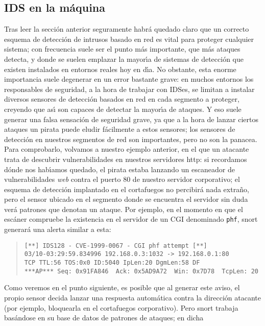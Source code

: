 \subsection{IDS en la m\'aquina}
Tras leer la secci\'on anterior seguramente habr\'a quedado claro que un 
correcto esquema de detecci\'on de intrusos basado en red es vital para 
proteger cualquier sistema; con frecuencia suele ser el punto m\'as importante,
que m\'as ataques detecta, y donde se suelen emplazar la mayor\'{\i}a de 
sistemas de detecci\'on que existen instalados en entornos reales hoy en 
d\'{\i}a. No obstante, esta enorme importancia suele degenerar en un error
bastante grave: en muchos entornos los responsables de seguridad, a la hora de
trabajar con IDSes, se limitan a instalar diversos sensores de detecci\'on 
basados en red en cada segmento a proteger, creyendo que as\'{\i} son capaces 
de detectar la mayor\'{\i}a de ataques. Y eso suele generar una falsa 
sensaci\'on de seguridad grave, ya que a la hora de lanzar ciertos ataques un
pirata puede eludir f\'acilmente a estos sensores; los sensores de detecci\'on 
en nuestros segmentos de red son importantes, pero no son la panacea. Para 
comprobarlo, volvamos a nuestro ejemplo anterior, en el que un atacante trata 
de descubrir vulnerabilidades en nuestros servidores {\sc http}: si 
recordamos d\'onde nos hab\'{\i}amos quedado, el pirata estaba lanzando un
escaneador de vulnerabilidades {\it web} contra el puerto 80 de nuestro servidor
corporativo; el esquema de detecci\'on implantado en el cortafuegos no 
percibir\'a nada extra\~no, pero el sensor ubicado en el segmento donde se
encuentra el servidor sin duda ver\'a patrones que denotan un ataque. Por 
ejemplo, en el momento en que el esc\'aner compruebe la existencia en el 
servidor de un CGI denominado {\tt phf}, {\sc snort} generar\'a una alerta
similar a esta:
\begin{quote}
\begin{verbatim}
[**] IDS128 - CVE-1999-0067 - CGI phf attempt [**]
03/10-03:29:59.834996 192.168.0.3:1032 -> 192.168.0.1:80
TCP TTL:56 TOS:0x0 ID:5040 IpLen:20 DgmLen:58 DF
***AP*** Seq: 0x91FA846  Ack: 0x5AD9A72  Win: 0x7D78  TcpLen: 20
\end{verbatim}
\end{quote}
Como veremos en el punto siguiente, es posible que al generar este aviso, el
propio sensor decida lanzar una respuesta autom\'atica contra la direcci\'on
atacante (por ejemplo, bloquearla en el cortafuegos corporativo). Pero {\sc
snort} trabaja bas\'andose en su base de datos de patrones de ataques; en dicha
